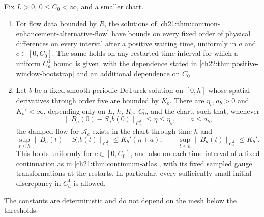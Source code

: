 \begin{lemma}\label{ch22:lem:alternative-smooth-reference}
Fix $L>0$, $0\le C_0<\infty$, and a smaller chart.
\begin{enumerate}
\item For flow data bounded by $R$, the solutions of \cref{ch21:thm:common-enhancement-alternative-flow} have bounds on every fixed order of physical differences on every interval after a positive waiting time, uniformly in $a$ and $c\in[0,C_0]$. The same holds on any restarted time interval for which a uniform $C_a^1$ bound is given, with the dependence stated in \cref{ch22:thm:positive-window-bootstrap} and an additional dependence on $C_0$.
\item Let $b$ be a fixed smooth periodic DeTurck solution on $[0,h]$ whose spatial derivatives through order five are bounded by $K_b$. There are $\eta_b,a_b>0$ and $K_b'<\infty$, depending only on $L$, $h$, $K_b$, $C_0$, and the chart, such that, whenever
\[
 \|B_a(0)-S_ab(0)\|_{C_a^1}\le\eta\le\eta_b,\qquad a\le a_b,
\]
the damped flow for $\mathcal A_c$ exists in the chart through time $h$ and
\begin{equation}\label{ch22:eq:alternative-reference-bound}
 \sup_{t\le h}\|B_a(t)-S_ab(t)\|_{C_a^1}\le K_b'(\eta+a),\qquad \sup_{t\le h}\|B_a(t)\|_{C_a^1}\le K_b' .
\end{equation}
This holds uniformly for $c\in[0,C_0]$, and also on each time interval of a fixed continuation as in \cref{ch21:thm:continuum-atlas}, with its fixed sampled gauge transformations at the restarts. In particular, every sufficiently small initial discrepancy in $C_a^1$ is allowed.
\end{enumerate}
The constants are deterministic and do not depend on the mesh below the thresholds.
\end{lemma}

